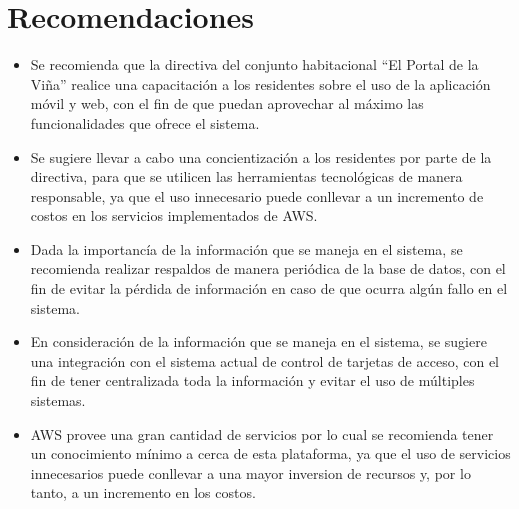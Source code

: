 \section{Recomendaciones}\label{sec:recomendaciones}
\begin{itemize}
    \item Se recomienda que la directiva del conjunto habitacional {\textquotedblleft}El Portal de la Viña{\textquotedblright} realice una capacitación a los residentes sobre el uso de la aplicación móvil y web, con el fin de que puedan aprovechar al máximo las funcionalidades que ofrece el sistema.
    \item Se sugiere llevar a cabo una concientización a los residentes por parte de la directiva, para que se utilicen las herramientas tecnológicas de manera responsable, ya que el uso innecesario puede conllevar a un incremento de costos en los servicios implementados de AWS.
    \item Dada la importancía de la información que se maneja en el sistema, se recomienda realizar respaldos de manera periódica de la base de datos, con el fin de evitar la pérdida de información en caso de que ocurra algún fallo en el sistema.
    \item En consideración de la información que se maneja en el sistema, se sugiere una integración con el sistema actual de control de tarjetas de acceso, con el fin de tener centralizada toda la información y evitar el uso de múltiples sistemas.
    \newpage
    \item AWS provee una gran cantidad de servicios por lo cual se recomienda tener un conocimiento mínimo a cerca de esta plataforma, ya que el uso de servicios innecesarios puede conllevar a una mayor inversion de recursos y, por lo tanto, a un incremento en los costos.
\end{itemize}